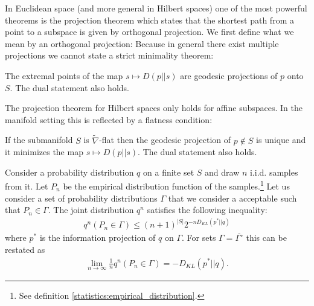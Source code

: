     In Euclidean space (and more general in Hilbert spaces) one of the most powerful theorems is the projection theorem which states that the shortest path from a point to a subspace is given by orthogonal projection. We first define what we mean by an orthogonal projection:
    Because in general there exist multiple projections we cannot state a strict minimality theorem:
    \begin{theorem}
        The extremal points of the map $s\mapsto D(p||s)$ are geodesic projections of $p$ onto $S$. The dual statement also holds.
    \end{theorem}
    The projection theorem for Hilbert spaces only holds for affine subspaces. In the manifold setting this is reflected by a flatness condition:
    \begin{property}
        If the submanifold $S$ is $\widetilde{\nabla}$-flat then the geodesic projection of $p\not\in S$ is unique and it minimizes the map $s\mapsto D(p||s)$. The dual statement also holds.
    \end{property}

    \begin{theorem}[Sanov]
        Consider a probability distribution $q$ on a finite set $S$ and draw $n$ i.i.d. samples from it. Let $P_n$ be the empirical distribution function of the samples.\footnote{See definition \ref{statistics:empirical_distribution}.} Let us consider a set of probability distributions $\Gamma$ that we consider a acceptable such that $P_n\in\Gamma$. The joint distribution $q^n$ satisfies the following inequality:
        \begin{gather}
            q^n(P_n\in\Gamma) \leq (n+1)^{|S|}2^{-n D_{KL}(p^*||q)}
        \end{gather}
        where $p^*$ is the information projection of $q$ on $\Gamma$. For sets $\Gamma=\overline{\Gamma^\circ}$ this can be restated as
        \begin{gather}
            \lim_{n\rightarrow\infty}\frac{1}{n}q^n(P_n\in\Gamma) = - D_{KL}(p^*||q).
        \end{gather}
    \end{theorem}

